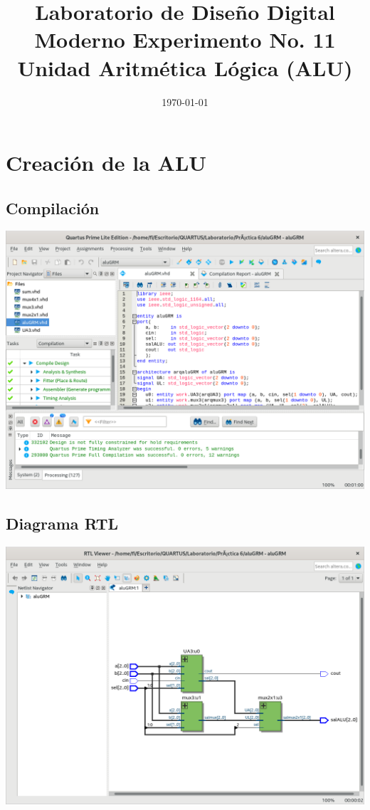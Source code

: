 \documentclass[10pt,a4paper]{article}
\title{Laboratorio de Diseño Digital Moderno Experimento No. 11 Unidad Aritmética Lógica (ALU)}
\author{}
\date{\today}
\begin{document}
	\maketitle
	
	\section{Creación de la ALU}
	\subsection{Compilación}
	\begin{center}
		\includegraphics[scale=0.35]{Compilacion.png}
	\end{center}
	
	\subsection{Diagrama RTL}
	\begin{center}
		\includegraphics[scale=0.35]{RTL.png}
	\end{center}
	
\end{document}
